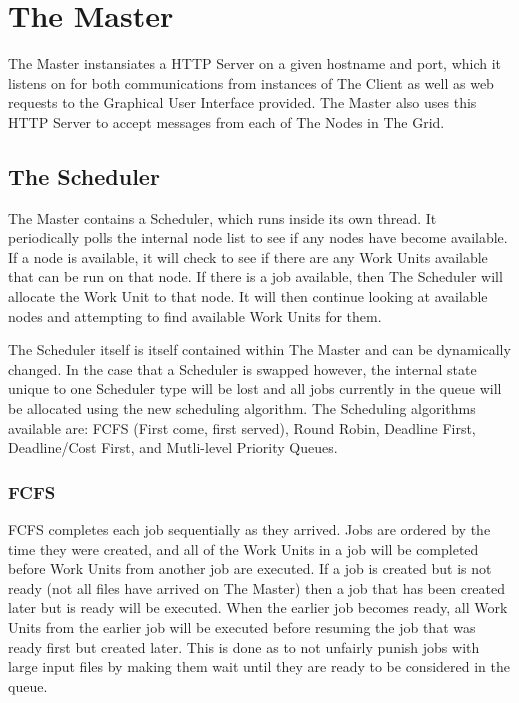 \section{The Master}
\label{themaster}

The Master instansiates a HTTP Server on a given hostname and port, which it listens on for both communications from instances of The Client as well as web requests to the Graphical User Interface provided. The Master also uses this HTTP Server to accept messages from each of The Nodes in The Grid. 

\subsection{The Scheduler}
\label{thescheduler}

The Master contains a Scheduler, which runs inside its own thread. It periodically polls the internal node list to see if any nodes have become available. If a node is available, it will check to see if there are any Work Units available that can be run on that node. If there is a job available, then The Scheduler will allocate the Work Unit to that node. It will then continue looking at available nodes and attempting to find available Work Units for them. 

The Scheduler itself is itself contained within The Master and can be dynamically changed. In the case that a Scheduler is swapped however, the internal state unique to one Scheduler type will be lost and all jobs currently in the queue will be allocated using the new scheduling algorithm. The Scheduling algorithms available are: FCFS (First come, first served), Round Robin, Deadline First, Deadline\slash Cost First, and Mutli-level Priority Queues. 

\subsubsection{FCFS}
\label{fcfs}

FCFS completes each job sequentially as they arrived. Jobs are ordered by the time they were created, and all of the Work Units in a job will be completed before Work Units from another job are executed. If a job is created but is not ready (not all files have arrived on The Master) then a job that has been created later but is ready will be executed. When the earlier job becomes ready, all Work Units from the earlier job will be executed before resuming the job that was ready first but created later. This is done as to not unfairly punish jobs with large input files by making them wait until they are ready to be considered in the queue.

